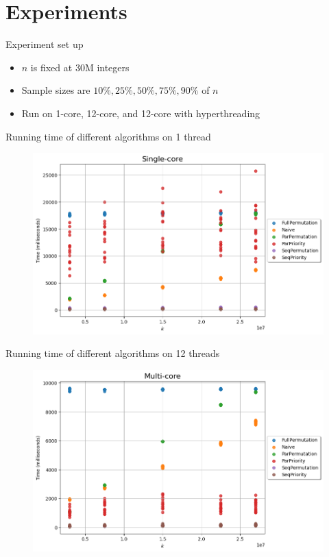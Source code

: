 \section{Experiments}

\begin{frame}{Experiment set up}
  \begin{itemize}
    \item \(n\) is fixed at 30M integers
    \item Sample sizes are \(10\%, 25\%, 50\%, 75\%, 90\%\) of \(n\)
    \item Run on 1-core, 12-core, and 12-core with hyperthreading
  \end{itemize}
\end{frame}

\begin{frame}{Running time of different algorithms on 1 thread}
  \begin{figure}
    \begin{center}
      \includegraphics[height=0.8\textheight]{figures/single_core.png}
    \end{center}
  \end{figure}
\end{frame}

\begin{frame}{Running time of different algorithms on 12 threads}
  \begin{figure}
    \begin{center}
      \includegraphics[height=0.8\textheight]{figures/multi_core.png}
    \end{center}
  \end{figure}
\end{frame}

